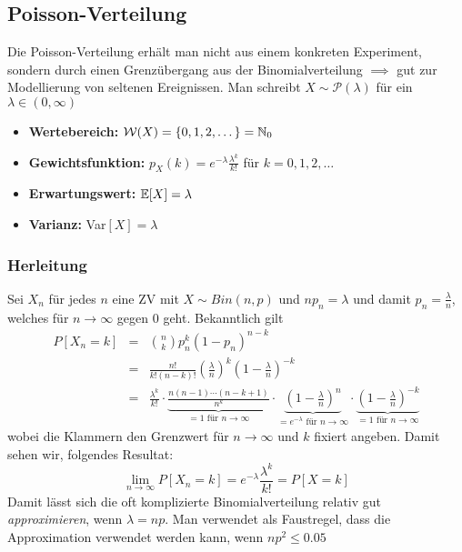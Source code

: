 \subsection{Poisson-Verteilung}
Die Poisson-Verteilung erhält man nicht aus einem konkreten Experiment, sondern durch einen Grenzübergang aus der Binomialverteilung $\implies$ gut zur Modellierung von seltenen Ereignissen. Man schreibt $X \sim \mathcal{P}(\lambda)$ für ein $\lambda \in (0, \infty)$
\begin{itemize}
\item \textbf{Wertebereich:} $\mathcal{W}(X) = \{0,1,2,\dots\} = \mathbb{N}_0$
\item \textbf{Gewichtsfunktion:} $p_X(k) = e^{-\lambda} \frac{\lambda^k}{k!}$ für $k= 0,1,2,\dots$
\item \textbf{Erwartungswert:} $\mathbb{E}[X] = \lambda$
\item \textbf{Varianz:} Var$[X] = \lambda $
\end{itemize}

\begin{mdframed}
\subsubsection*{Herleitung}
Sei $X_n$ für jedes $n$ eine ZV mit $X \sim Bin(n,p)$ und $np_n = \lambda$ und damit $p_n = \frac{\lambda}{n}$, welches für $n\to\infty$ gegen 0 geht. Bekanntlich gilt
\begin{eqnarray}
P[X_n = k] & = & \binom{n}{k} p_n^k (1-p_n)^{n-k} \\ & = & \frac{n!}{k!(n-k)!} \left(\frac{\lambda}{n} \right)^k \left(1-\frac{\lambda}{n}\right)^{-k} \\
& = & \frac{\lambda^k}{k!} \cdot \underbrace{\frac{n(n-1) \cdots (n-k+1)}{n^k}}_{= 1 \mbox{ für } n\to \infty} \cdot \underbrace{\left(1-\frac{\lambda}{n} \right)^n}_{=e^{-\lambda} \mbox{ für } n \to \infty} \cdot \underbrace{\left(1-\frac{\lambda}{n}\right)^{-k}}_{=1 \mbox{ für } n \to \infty}
\end{eqnarray}
wobei die Klammern den Grenzwert für $n\to \infty$ und $k$ fixiert angeben. Damit sehen wir, folgendes Resultat:
$$ \lim_{n\to\infty} P[X_n = k] = e^{-\lambda} \frac{\lambda^k}{k!}=P[X=k]$$
Damit lässt sich die oft komplizierte Binomialverteilung relativ gut \textit{approximieren}, wenn $\lambda = np$. Man verwendet als Faustregel, dass die Approximation verwendet werden kann, wenn $np^2 \leq 0.05$
\end{mdframed}